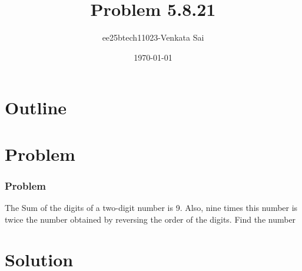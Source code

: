 \documentclass{beamer}
\title{Problem 5.8.21}
\author{ee25btech11023-Venkata Sai}
\date{\today}
\theoremstyle{remark}
\numberwithin{equation}{section}
\begin{document}
\begin{frame}
\titlepage
\end{frame}

\section*{Outline}
\begin{frame}
\tableofcontents
\end{frame}

\section{Problem}

\begin{frame}
\frametitle{Problem}
\setcounter{section}{1}
The Sum of the digits of a two-digit number is 9. Also, nine times this number is twice the number obtained by reversing the order of the digits. Find the number
\end{frame}
\section{Solution}
\end{document}
